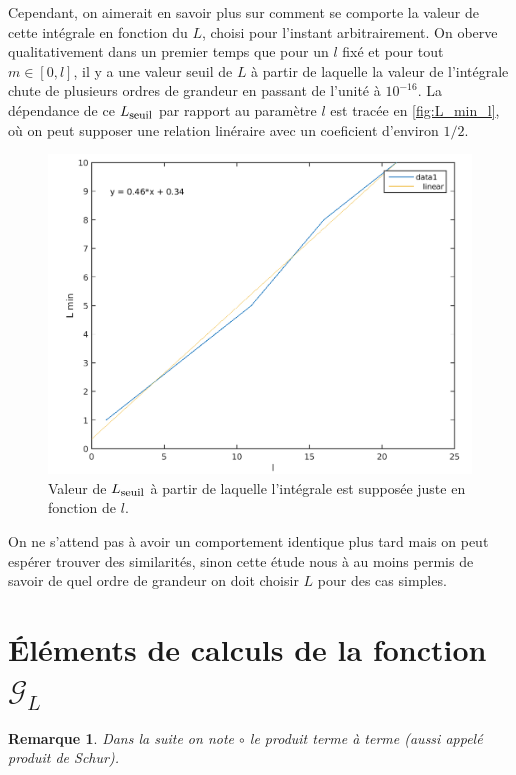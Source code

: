 \documentclass[11pt]{article}
\newtheorem{rmq}{Remarque}
\newcommand{\smbox}[1]{\mbox{\footnotesize #1}}
\newcommand{\lG}{\mathcal{G}}
\begin{document}
Cependant, on aimerait en savoir plus sur comment se comporte la valeur de cette intégrale en fonction du $L$, choisi pour l'instant
arbitrairement. On oberve qualitativement dans un premier temps que pour un $l$ fixé et pour tout $m\in[0,l]$, il y a une valeur seuil de
$L$ à partir de laquelle la valeur de l'intégrale chute de plusieurs ordres de grandeur en passant de l'unité à $10^{-16}$. La dépendance
de ce $L_{\smbox{seuil}}$ par rapport au paramètre $l$ est tracée en \autoref{fig:L_min_l}, o\`u on peut supposer une relation
linéraire avec un coeficient d'environ $1/2$. 
\begin{figure}
  \centering
  \includegraphics[height=0.4\textheight]{L_min_l}
  \caption{Valeur de $L_{\smbox{seuil}}$  à partir de laquelle l'intégrale est supposée juste en fonction de $l$.}
  \label{fig:L_min_l}
\end{figure}

On ne s'attend pas à avoir un comportement identique plus tard mais on peut espérer trouver des similarités, sinon cette étude nous à au
moins permis de savoir de quel ordre de grandeur on doit choisir $L$ pour des cas simples. 

\section{Éléments de calculs de la fonction $\lG_L$}

\begin{rmq}
  Dans la suite on note $\circ$ le produit terme à terme (aussi appelé produit de Schur).
\end{rmq}
\end{document}

